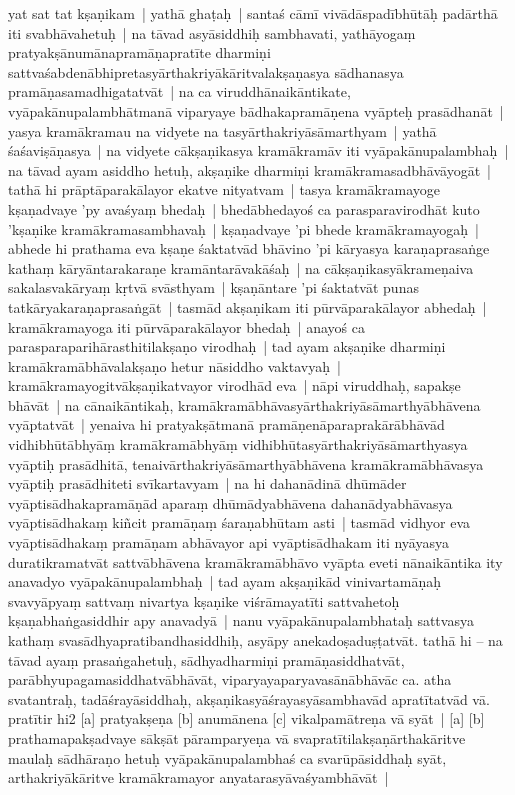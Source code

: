 \documentclass[article,12pt,a4paper]{memoir}%
\begin{document}
	    \pstart  \leavevmode%
	    \hphantom{.}
	   \label{thakur75-83.8} yat sat tat kṣaṇikam | yathā ghaṭaḥ | santaś cāmī vivādāspadībhūtāḥ padārthā iti svabhāvahetuḥ | \label{thakur75-83.10} na tāvad asyāsiddhiḥ sambhavati, yathāyogaṃ pratyakṣānumānapramāṇapratīte dharmiṇi sattvaśabdenābhipretasyārthakriyākāritvalakṣaṇasya sādhanasya pramāṇasamadhigatatvāt | \label{thakur75-83.12} na ca viruddhānaikāntikate, vyāpakānupalambhātmanā viparyaye bādhakapramāṇena vyāpteḥ prasādhanāt | \label{thakur75-83.13} yasya kramākramau na vidyete na tasyārthakriyāsāmarthyam | yathā śaśaviṣāṇasya | na vidyete cākṣaṇikasya kramākramāv iti vyāpakānupalambhaḥ | \label{thakur75-83.14} na tāvad ayam asiddho hetuḥ, akṣaṇike dharmiṇi kramākramasadbhāvāyogāt | tathā hi prāptāparakālayor ekatve nityatvam | tasya kramākramayoge kṣaṇadvaye 'py avaśyaṃ bhedaḥ | bhedābhedayoś ca parasparavirodhāt kuto 'kṣaṇike kramākramasambhavaḥ | kṣaṇadvaye 'pi bhede kramākramayogaḥ | abhede hi prathama eva kṣaṇe śaktatvād bhāvino 'pi kāryasya karaṇaprasaṅge kathaṃ kāryāntarakaraṇe kramāntarāvakāśaḥ | na cākṣaṇikasyākrameṇaiva sakalasvakāryaṃ kṛtvā svāsthyam | kṣaṇāntare 'pi śaktatvāt punas tatkāryakaraṇaprasaṅgāt | \label{thakur75-83.21} tasmād akṣaṇikam iti pūrvāparakālayor abhedaḥ | kramākramayoga iti pūrvāparakālayor bhedaḥ | anayoś ca parasparaparihārasthitilakṣaṇo virodhaḥ | \label{thakur75-83.23} tad ayam akṣaṇike dharmiṇi kramākramābhāvalakṣaṇo hetur nāsiddho vaktavyaḥ | kramākramayogitvākṣaṇikatvayor virodhād eva | \label{thakur75-84.1} nāpi viruddhaḥ, sapakṣe bhāvāt | \label{thakur75-84.2} na cānaikāntikaḥ, kramākramābhāvasyārthakriyāsāmarthyābhāvena vyāptatvāt | \label{thakur75-84.3} yenaiva hi pratyakṣātmanā pramāṇenāparaprakārābhāvād vidhibhūtābhyāṃ kramākramābhyāṃ vidhibhūtasyārthakriyāsāmarthyasya vyāptiḥ prasādhitā, tenaivārthakriyāsāmarthyābhāvena kramākramābhāvasya vyāptiḥ prasādhiteti svīkartavyam | na hi dahanādinā dhūmāder vyāptisādhakapramāṇād aparaṃ dhūmādyabhāvena dahanādyabhāvasya vyāptisādhakaṃ kiñcit pramāṇaṃ śaraṇabhūtam asti | tasmād vidhyor eva vyāptisādhakaṃ pramāṇam abhāvayor api vyāptisādhakam iti nyāyasya duratikramatvāt sattvābhāvena kramākramābhāvo vyāpta eveti nānaikāntika ity anavadyo vyāpakānupalambhaḥ | tad ayam akṣaṇikād vinivartamāṇaḥ svavyāpyaṃ sattvaṃ nivartya kṣaṇike viśrāmayatīti sattvahetoḥ kṣaṇabhaṅgasiddhir apy anavadyā | \label{thakur75-85.1} nanu vyāpakānupalambhataḥ sattvasya kathaṃ svasādhyapratibandhasiddhiḥ, asyāpy anekadoṣaduṣṭatvāt. tathā hi – na tāvad ayaṃ prasaṅgahetuḥ, sādhyadharmiṇi pramāṇasiddhatvāt, parābhyupagamasiddhatvābhāvāt, viparyayaparyavasānābhāvāc ca. atha svatantraḥ, tadāśrayāsiddhaḥ, akṣaṇikasyāśrayasyāsambhavād apratītatvād vā. pratītir hi2 [a] pratyakṣeṇa [b] anumānena [c] vikalpamātreṇa vā syāt | \label{thakur75-85.6} [a] [b] prathamapakṣadvaye sākṣāt pāramparyeṇa vā svapratītilakṣaṇārthakāritve maulaḥ sādhāraṇo hetuḥ vyāpakānupalambhaś ca svarūpāsiddhaḥ syāt, arthakriyākāritve kramākramayor anyatarasyāvaśyambhāvāt | 
\end{document}
